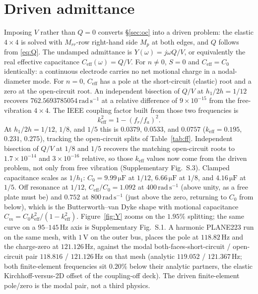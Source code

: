 \documentclass[11pt]{article}
\begin{document}
\section{Driven admittance}\label{sec:Y}
Imposing $V$ rather than $Q=0$ converts \S\ref{sec:oc} into a driven
problem: the elastic $4\times4$ is solved with $M_{rr}$-row right-hand
side $M_p$ at both edges, and $Q$ follows from \eqref{eq:Q}. The undamped
admittance is $Y(\omega)=j\omega Q/V$, or equivalently the real effective
capacitance $C_{\mathrm{eff}}(\omega)=Q/V$. For $n\neq0$, $S=0$ and
$C_{\mathrm{eff}}=C_0$ identically: a continuous electrode carries no
net motional charge in a nodal-diameter mode. For $n=0$,
$C_{\mathrm{eff}}$ has a pole at the short-circuit (elastic) root and a
zero at the open-circuit root. An independent bisection of $Q/V$ at
$h_1/2h=1/12$ recovers $762.5693785054\,\mathrm{rad\,s^{-1}}$ at a
relative difference of $9\times10^{-15}$ from the free-vibration
$4\times4$. The IEEE coupling factor \cite{ieee176} built from those two
frequencies is
\begin{equation}
k_{\mathrm{eff}}^{2}=1-(f_{r}/f_{a})^{2}.
\label{eq:keff}
\end{equation}
At $h_1/2h=1/12$, $1/8$, and $1/5$ this is $0.0379$, $0.0533$, and
$0.0757$ ($k_{\mathrm{eff}}=0.195$, $0.231$, $0.275$), tracking the
open-circuit splits of Table~\ref{tab:ff}. Independent bisection of
$Q/V$ at $1/8$ and $1/5$ recovers the matching open-circuit roots to
$1.7\times10^{-14}$ and $3\times10^{-16}$ relative, so those
$k_{\mathrm{eff}}$ values now come from the driven problem, not
only from free vibration (Supplementary Fig.~S.3). Clamped capacitance
scales as $1/h_1$: $C_0=9.99\,\mathrm{\mu F}$ at $1/12$,
$6.66\,\mathrm{\mu F}$ at $1/8$, and $4.16\,\mathrm{\mu F}$ at $1/5$.
Off resonance at $1/12$,
$C_{\mathrm{eff}}/C_0=1.092$ at $400\,\mathrm{rad\,s^{-1}}$ (above
unity, as a free plate must be) and $0.752$ at
$800\,\mathrm{rad\,s^{-1}}$ (just above the zero, returning to $C_0$
from below), which is
the Butterworth--van Dyke shape with motional capacitance
$C_m=C_0 k_{\mathrm{eff}}^2/(1-k_{\mathrm{eff}}^2)$.
Figure~\ref{fig:Y} zooms on the $1.95\%$ splitting; the same curve on a
$95$--$145\,\mathrm{Hz}$ axis is Supplementary Fig.~S.1.
A harmonic PLANE223 run on the same mesh, with $1\,\mathrm{V}$ on the
outer bus, places the pole at $118.82\,\mathrm{Hz}$ and the
charge-zero at $121.126\,\mathrm{Hz}$, against the modal
both-faces-short-circuit / open-circuit pair $118.816$ /
$121.126\,\mathrm{Hz}$ on that mesh (analytic $119.052$ /
$121.367\,\mathrm{Hz}$; both finite-element frequencies sit $0.20\%$
below their analytic partners, the elastic Kirchhoff-versus-2D offset
of the coupling-off deck). The driven finite-element pole/zero is the
modal pair, not a third physics.
\end{document}
